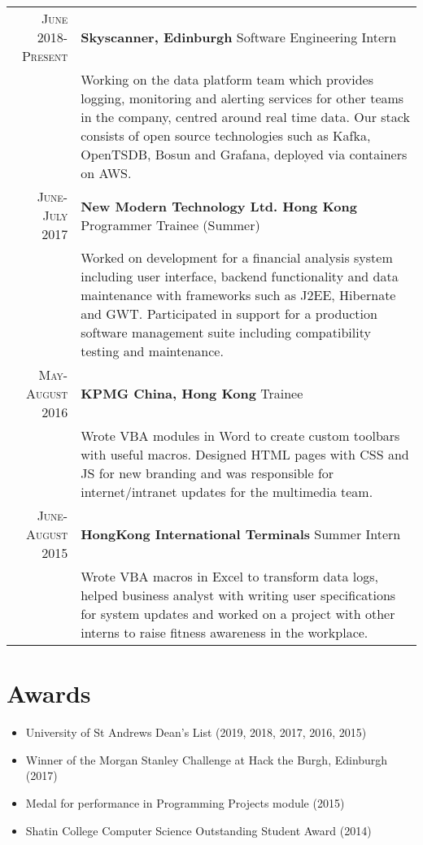 \documentclass{article}
\newcommand{\n}[0]{\\[\baselineskip]}
\begin{document}
\renewcommand{\arraystretch}{1.1}
\begin{tabular}{r|p{16cm}}
\textsc{June 2018-Present} & \textbf{Skyscanner, Edinburgh} Software Engineering Intern \\

&\footnotesize{Working on the data platform team which provides logging, monitoring and alerting services for other teams in the company, centred around real time data. Our stack consists of open source technologies such as Kafka, OpenTSDB, Bosun and Grafana, deployed via containers on AWS.} \n


\textsc{June-July 2017} & \textbf{New Modern Technology Ltd. Hong Kong} Programmer Trainee (Summer) \\

&\footnotesize{Worked on development for a financial analysis system including user interface, backend functionality and data maintenance with frameworks such as J2EE, Hibernate and GWT. Participated in support for a production software management suite including compatibility testing and maintenance.}\n


\textsc{May-August 2016} & \textbf{KPMG China, Hong Kong} Trainee \\
 
&\footnotesize{Wrote VBA modules in Word to create custom toolbars with useful macros. Designed HTML pages with CSS and JS for new branding and was responsible for internet/intranet updates for the multimedia team.}\n

\textsc{June-August 2015} & \textbf{HongKong International Terminals} Summer Intern\\

&\footnotesize{Wrote VBA macros in Excel to transform data logs, helped business analyst with writing user specifications for system updates and worked on a project with other interns to raise fitness awareness in the workplace.}\\

\end{tabular}

\section*{Awards}
\setlength\multicolsep{0pt}
\begin{multicols}{2}
\begin{itemize}
\item University of St Andrews Dean's List (2019, 2018, 2017, 2016, 2015)
\item Winner of the Morgan Stanley Challenge at Hack the Burgh, Edinburgh (2017)
\end{itemize}
\columnbreak
\begin{itemize}
\item Medal for performance in Programming Projects module (2015)
\item Shatin College Computer Science Outstanding Student Award (2014)
\end{itemize}
\end{multicols}
\end{document}
